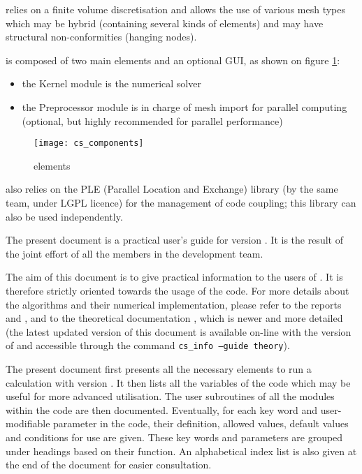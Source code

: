 \CS relies on a finite volume discretisation and allows the use of
various mesh types which may be hybrid (containing several kinds of
elements) and may have structural non-conformities (hanging nodes).


\CS is composed of two main elements and an optional GUI,
as shown on figure \ref{Fig_elements}:
\begin{itemize}
\item the Kernel module is the numerical solver
\item the Preprocessor module is in charge of mesh import
for parallel computing (optional, but highly recommended for parallel
performance)\\
\end{itemize}

\begin{figure}[!h]
\centerline{
\texttt{[image: cs\_components]}}
\caption{\CS elements}\label{Fig_elements}
\end{figure}

\indent\CS also relies on the PLE (Parallel Location and Exchange) library (by
the same team, under LGPL licence) for the management of code coupling;
this library can also be used independently.

The present document is a practical user's guide for \CS version \verscs.
It is the result of the joint effort of
all the members in the development team.

The aim of this document is to give practical information to the users of
\CS. It is therefore strictly oriented towards the usage of the code.
For more details about the algorithms and their numerical
implementation, please refer to the reports \cite{mechitoua98} and
\cite{boucker00}, and to the theoretical documentation \cite{theory},
which is newer and more detailed
(the latest updated version of this document
is available on-line with the version of \CS and accessible through the command
\texttt{cs\_info --guide theory}).

The present document first
presents all the necessary elements to run a calculation
with \CS version \verscs. It then lists all the variables of the code
which may be useful for more advanced utilisation.
The user subroutines of all the modules within the code are then documented.
Eventually, for each key word and user-modifiable parameter in the code,
their definition, allowed values, default values and conditions for use are given.
These key words and parameters are grouped under headings
based on their function. An alphabetical index list is also given at the end of
the document for easier consultation.

